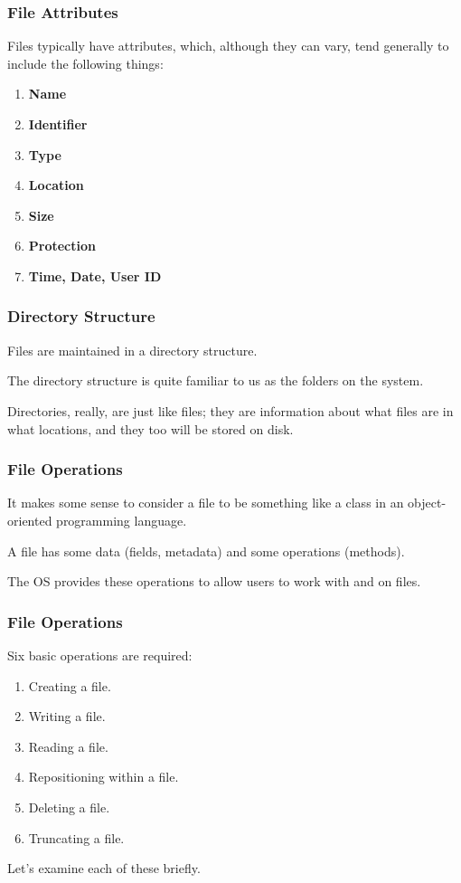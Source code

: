 \begin{frame}
\frametitle{File Attributes}

Files typically have attributes, which, although they can vary, tend generally to include the following things:

\begin{enumerate}
	\item \textbf{Name}
	\item \textbf{Identifier}
	\item \textbf{Type}
	\item \textbf{Location}
	\item \textbf{Size}
	\item \textbf{Protection}
	\item \textbf{Time, Date, User ID}
\end{enumerate}


\end{frame}

\begin{frame}
\frametitle{Directory Structure}

Files are maintained in a directory structure. 

The directory structure is quite familiar to us as the folders on the system. 

Directories, really, are just like files; they are information about what files are in what locations, and they too will be stored on disk.


\end{frame}

\begin{frame}
\frametitle{File Operations}

It makes some sense to consider a file to be something like a class in an object-oriented programming language. 

A file has some data (fields, metadata) and some operations (methods). 

The OS provides these operations to allow users to work with and on files. 


\end{frame}

\begin{frame}
\frametitle{File Operations}
Six basic operations are required:

\begin{enumerate}
	\item Creating a file.
	\item Writing a file.
	\item Reading a file.
	\item Repositioning within a file.
	\item Deleting a file.
	\item Truncating a file.
\end{enumerate}

Let's examine each of these briefly.

\end{frame}

